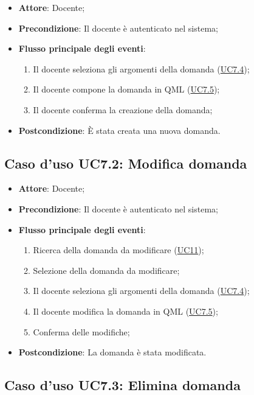 \documentclass[12pt,a4paper]{article}
\begin{document}
\begin{itemize}

\item \textbf{Attore}: Docente; 
\item \textbf{Precondizione}: Il docente è autenticato nel sistema;

\item \textbf{Flusso principale degli eventi}:
\begin{enumerate}
	\item Il docente seleziona gli argomenti della domanda (\hyperlink{UC7.4}{UC7.4});
	\item Il docente compone la domanda in QML  (\hyperlink{UC7.5}{UC7.5});
	\item Il docente conferma la creazione della domanda;
	
\end{enumerate}
\item \textbf{Postcondizione}: È stata creata una nuova domanda.
\end{itemize}
\hypertarget{UC7.2}{}
\subsection{Caso d'uso UC7.2: Modifica domanda}

\begin{itemize}

\item \textbf{Attore}: Docente; 
\item \textbf{Precondizione}: Il docente è autenticato nel sistema;

\item \textbf{Flusso principale degli eventi}:
\begin{enumerate}
	\item Ricerca della domanda da modificare (\hyperlink{UC11}{UC11});
	\item Selezione della domanda da modificare;
	\item Il docente seleziona gli argomenti della domanda	 (\hyperlink{UC7.4}{UC7.4});
	\item Il docente modifica la domanda in QML	 (\hyperlink{UC7.5}{UC7.5});
	\item Conferma delle modifiche;
	
\end{enumerate}
\item \textbf{Postcondizione}: La domanda è stata modificata.
\end{itemize}
\hypertarget{UC7.3}{}
\subsection{Caso d'uso UC7.3: Elimina domanda}
\end{document}

